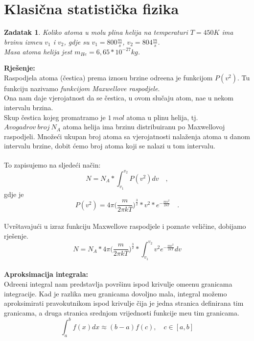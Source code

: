 \documentclass[a4paper,12pt]{article}
\newtheorem{ZDK}{Zadatak}[section]
\begin{document}
\section{Klasi\v{c}na statisti\v{c}ka fizika}
\begin{ZDK}
	Koliko atoma u molu plina helija na temperaturi $T=450K$ ima brzinu izme\dj u $v_1$ i $v_2$, gdje su  $v_1=800\frac{m}{s}$, $v_2=804\frac{m}{s}$. \\
	Masa atoma helija jest $m_{He}=6,65*{10}^{-27}kg$.
\end{ZDK}
\textbf{Rje\v{s}enje:} \\
\newline
Raspodjela atoma (\v{c}estica) prema iznosu brzine odre\dj ena je funkcijom $P(v^2)$. Tu funkciju nazivamo \textit{funkcijom Maxwellove raspodjele}. \\
Ona nam daje vjerojatnost da se \v{c}estica, u ovom slu\v{c}aju atom, na\dj e u nekom intervalu brzina. \\
Skup \v{c}estica kojeg promatramo je $1\ mol$ atoma u plinu helija, tj. $Avogadrov\ broj\ N_A$ atoma helija ima brzinu distribuiranu po Maxwellovoj raspodjeli.
Mno\v{z}e\'ci ukupan broj atoma sa vjerojatnosti nala\v{z}enja atoma u danom intervalu brzine, dobit \'cemo broj atoma koji se nalazi u tom intervalu. \\
\\
To zapisujemo na sljede\'ci na\v{c}in:
$$ N=N_A * \int_{v_1}^{v_2}P(v^2)dv \quad, $$
gdje je
$$ P(v^2)=4\pi \Big( \frac{m}{2\pi kT} \Big)^{\frac{3}{2}}*v^2*e^{-\frac{mv^2}{2kT}} \quad. $$
\\
Uvr\v{s}tavaju\'ci u izraz funkciju Maxwellove raspodjele i poznate veli\v{c}ine, dobijamo rje\v{s}enje.
\\
$$ N=N_A*4\pi \Big( \frac{m}{2\pi kT} \Big)^{\frac{3}{2}}*\int_{v_1}^{v_2} v^2e^{-\frac{mv^2}{2kT}}dv $$
\\
\textbf{Aproksimacija integrala:} \\
Odre\dj eni integral nam predstavlja povr\v{s}inu ispod krivulje ome\dj enu granicama integracije. Kad je razlika me\dj u granicama dovoljno mala,
integral mo\v{z}emo aproksimirati pravokutnikom ispod krivulje \v{c}ija je jedna stranica definirana tim granicama, a druga stranica srednjom vrijednosti funkcije 
me\dj u tim granicama. \\
$$ \int_{a}^{b}f(x)dx \approx (b-a)f(c), \quad c \in [a,b]  $$
\end{document}
